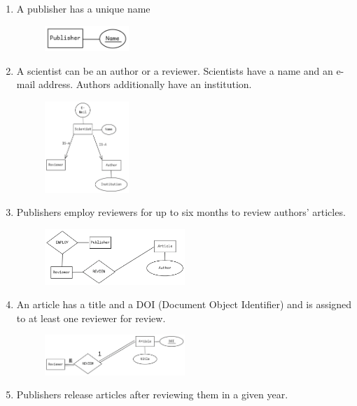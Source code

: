 \documentclass{article}
\begin{document}
\begin{enumerate}
\item A publisher has a unique name

\begin{figure}[h]
\centering
\includegraphics[width=0.3\textwidth]{6.1.png}
\end{figure}

\item A scientist can be an author or a reviewer. Scientists have a name and an e-mail address.
Authors additionally have an institution.

\begin{figure}[h]
	\centering
	\includegraphics[width=0.3\textwidth]{6.2}
\end{figure}

\item Publishers employ reviewers for up to six months to review authors’ articles.

\begin{figure}[h]
	\centering
	\includegraphics[width=0.5\textwidth]{6.3}
\end{figure}

\item An article has a title and a DOI (Document Object Identifier) and is assigned to at least one
reviewer for review.

\begin{figure}[H]
	\centering
	\includegraphics[width=0.5\textwidth]{6.4}
\end{figure}

\item Publishers release articles after reviewing them in a given year.
\end{enumerate}
\end{document}
